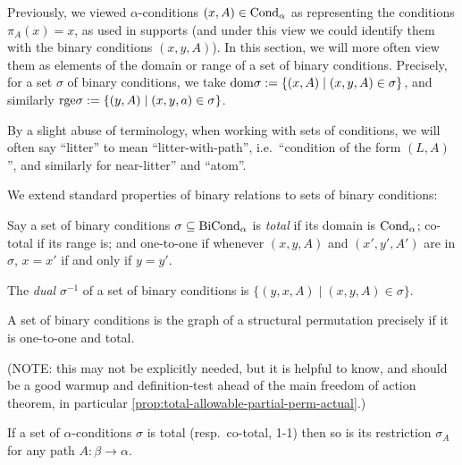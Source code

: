\begin{definition}
  \label{def:condition-dom-rge}
  \leanok
  Previously, we viewed $\alpha$-conditions $(x,A) \in \mathrm{Cond}_\alpha$ as representing the conditions $\pi_A(x) = x$, as used in supports (and under this view we could identify them with the binary conditions $(x,y,A)$).  In this section, we will more often view them as elements of the domain or range of a set of binary conditions.  Precisely, for a set $\sigma$ of binary conditions, we take $\mathrm{dom} \sigma := \{ (x,A) \mid (x,y,A) \in \sigma \}$, and similarly $\mathrm{rge} \sigma := \{ (y,A) \mid (x,y,a) \in \sigma \}$.

  By a slight abuse of terminology, when working with sets of conditions, we will often say “litter” to mean “litter-with-path”, i.e.\ “condition of the form $(L,A)$”, and similarly for near-litter” and “atom”.
\end{definition}

\begin{definition}
  \label{def:condition-total-1-1}
  \leanok
  We extend standard properties of binary relations to sets of binary conditions:

  Say a set of binary conditions $\sigma \subseteq \mathrm{BiCond}_\alpha$ is \emph{total} if its domain is $\mathrm{Cond}_\alpha$; co-total if its range is; and one-to-one if whenever $(x,y,A)$ and $(x',y',A')$ are in $\sigma$, $x = x'$ if and only if $y = y'$.

  The \emph{dual} $\sigma^{-1}$ of a set of binary conditions is $\{ (y,x,A) \mid (x,y,A) \in \sigma \}$.
\end{definition}

\begin{proposition}
  \label{prop:total-1-1-gives-perm}
  \leanok
  A set of binary conditions is the graph of a structural permutation precisely if it is one-to-one and total.

  (NOTE: this may not be explicitly needed, but it is helpful to know, and should be a good warmup and definition-test ahead of the main freedom of action theorem, in particular \cref{prop:total-allowable-partial-perm-actual}.)
\end{proposition}

\begin{proposition}
  \label{prop:total-1-1-restriction}
  If a set of $\alpha$-conditions $\sigma$ is total (resp.\ co-total, 1-1) then so is its restriction $\sigma_A$ for any path $A : \beta \to \alpha$.
\end{proposition}

